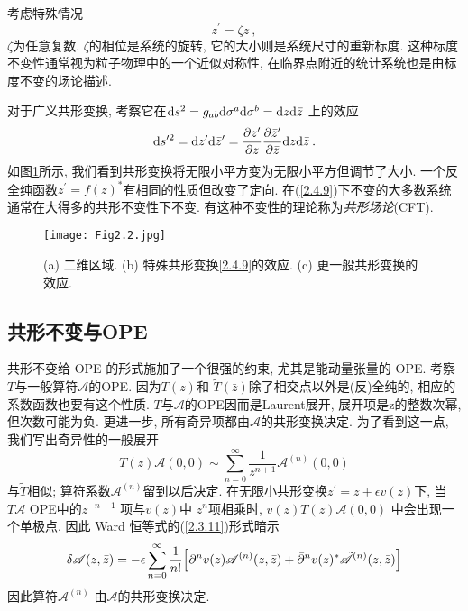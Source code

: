 考虑特殊情况
\begin{equation}\label{2.4.9}
z^{\prime}=\zeta z \:,
\end{equation}
$\zeta$为任意复数. $\zeta$的相位是系统的旋转, 它的大小则是系统尺寸的重新标度. 这种标度不变性通常视为粒子物理中的一个近似对称性, 在临界点附近的统计系统也是由标度不变的场论描述.

对于广义共形变换, 考察它在$\mathrm{d} s^{2}=g_{ab}\mathrm{d}\sigma^{a} \mathrm{d} \sigma^{b}=\mathrm{d} z \mathrm{d} \bar{z}$ 上的效应
\begin{equation}
\mathrm{d} s^{\prime 2}=\mathrm{d} z^{\prime} \mathrm{d} \bar{z}^{\prime}=\frac{\partial z^{\prime}}{\partial z} \frac{\partial \bar{z}^{\prime}}{\partial \bar{z}} \mathrm{d} z \mathrm{d} \bar{z} \:.
\end{equation}
如图\ref{fig2.2}所示, 我们看到共形变换将无限小平方变为无限小平方但调节了大小. 一个反全纯函数$z^{\prime}=f(z)^{*}$有相同的性质但改变了定向. 
在(\ref{2.4.9})下不变的大多数系统通常在大得多的共形不变性下不变. 有这种不变性的理论称为\emph{共形场论}(CFT). 
\begin{figure}[h]
	\begin{center}
		\texttt{[image: Fig2.2.jpg]}
\caption{(a) 二维区域. (b) 特殊共形变换\eqref{2.4.9}的效应. (c) 更一般共形变换的效应.} \label{fig2.2}
	\end{center}
\end{figure}

\subsection*{共形不变与OPE}

共形不变给 OPE 的形式施加了一个很强的约束, 尤其是能动量张量的 OPE. 考察$T$与一般算符$\mathscr{A}$的OPE. 因为$T(z)$和 $\tilde{T}(\bar{z})$除了相交点以外是(反)全纯的, 相应的系数函数也要有这个性质. $T$与$\mathscr{A}$的OPE因而是Laurent展开, 展开项是z的整数次幂, 但次数可能为负. 更进一步, 所有奇异项都由$\mathscr{A}$的共形变换决定. 为了看到这一点, 我们写出奇异性的一般展开
\begin{equation}\label{2.4.11}
T(z) \mathscr{A}(0,0) \sim \sum_{n=0}^{\infty} \frac{1}{z^{n+1}} \mathscr{A}^{(n)}(0,0)
\end{equation}
与$\tilde{T}$相似; 算符系数$\mathscr{A}^{(n)}$留到以后决定. 在无限小共形变换$z^{\prime}=z+\epsilon v(z)$下, 当$T \mathscr{A}$ OPE中的$z^{-n-1}$ 项与$v(z)$中 $z^n$项相乘时, $v(z) T(z) \mathscr{A}(0,0)$ 中会出现一个单极点. 因此 Ward 恒等式的(\ref{2.3.11})形式暗示
\begin{equation}\label{2.4.12}
\delta \mathscr{A}(z, \bar{z})=-\epsilon \sum_{n=0}^{\infty} \frac{1}{n !}\Bigl[\partial^{n} v(z) \mathscr{A}^{(n)}(z, \bar{z})+\bar{\partial}^{n} v(z)^{*} \tilde{\mathscr{A}}^{(n)}(z, \bar{z})\Bigr]
\end{equation}
因此算符$\mathscr{A}^{(n)}$ 由$\mathscr{A}$的共形变换决定. 

